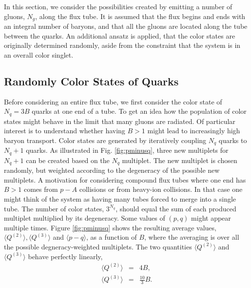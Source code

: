 \documentclass[aps, prc, 12pt, nofootinbib, showpacs, superscriptaddress, tightenlines, groupedaddress]{revtex4-2}
\begin{document}
In this section, we consider the possibilities created by emitting a number of gluons, $N_g$, along the flux tube. It is assumed that the flux begins and ends with an integral number of baryons, and that all the gluons are located along the tube between the quarks. An additional ansatz is applied, that the color states are originally determined randomly, aside from the constraint that the system is in an overall color singlet.

\subsection{Randomly Color States of Quarks}

Before considering an entire flux tube, we first consider the color state of $N_q=3B$ quarks at one end of a tube. To get an idea how the population of color states might behave in the limit that many gluons are radiated. Of particular interest is to understand whether having $B>1$ might lead to increasingly high baryon transport. Color states are generated by iteratively coupling $N_q$ quarks to $N_q+1$ quarks. As illustrated in Fig. \ref{fig:pminusq}, three new multiplets for $N_q+1$ can be created based on the $N_q$ multiplet. The new multiplet is chosen randomly, but weighted according to the degeneracy of the possible new multiplets. A motivation for considering compound flux tubes where one end has $B>1$ comes from $p-A$ collisions or from heavy-ion collisions. In that case one might think of the system as having many tubes forced to merge into a single tube. The number of color states, $3^{N_q}$, should equal the sum of each produced multiplet multiplied by its degeneracy. Some values of $(p,q)$ might appear multiple times. Figure \ref{fig:pminusq} shows the resulting average values, $\langle Q^{(2)}\rangle, \langle Q^{(3)}\rangle$ and $\langle p-q\rangle$, as a function of $B$, where the averaging is over all the possible degneracy-weighted multiplets. The two quantities $\langle Q^{(2)}\rangle$ and  $\langle Q^{(3)}\rangle$ behave perfectly linearly,
\begin{eqnarray}
\langle Q^{(2)}\rangle&=&4B,\\
\langle Q^{(3)}\rangle&=&\frac{10}{3}B.
\end{eqnarray}
\end{document}
